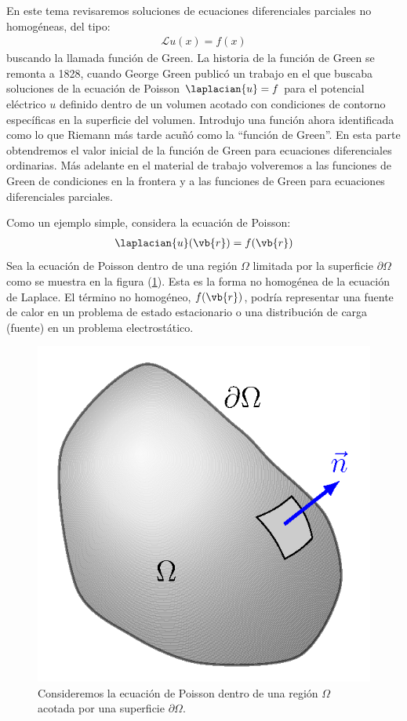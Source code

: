 En este tema revisaremos soluciones de ecuaciones diferenciales parciales no homogéneas, del tipo:
\begin{align*}
\mathcal{L} u (x) = f (x)
\end{align*}
buscando la llamada función de Green. La historia de la función de Green se remonta a 1828, cuando George Green publicó un trabajo en el que buscaba soluciones de la ecuación de Poisson $\laplacian{u} = f$ para el potencial eléctrico $u$ definido dentro de un volumen acotado con condiciones de contorno específicas en la superficie del volumen. Introdujo una función ahora identificada como lo que Riemann más tarde acuñó como la \enquote{función de Green}. En esta parte obtendremos el valor inicial de la función de Green para ecuaciones diferenciales ordinarias. Más adelante en el material de trabajo volveremos a las funciones de Green de condiciones en la frontera y a las funciones de Green para ecuaciones diferenciales parciales.
\par
Como un ejemplo simple, considera la ecuación de Poisson:
\begin{align*}
\laplacian{u} (\vb{r}) = f (\vb{r})
\end{align*}
Sea la ecuación de Poisson dentro de una región $\Omega$ limitada por la superficie $\partial \Omega$ como se muestra en la figura (\ref{fig:figura_07_01}). Esta es la forma no homogénea de la ecuación de Laplace. El término no homogéneo, $f (\vb{r})$, podría representar una fuente de calor en un problema de estado estacionario o una distribución de carga (fuente) en un problema electrostático.
\begin{figure}[H]
    \centering
    \includegraphics[scale=0.35]{Imagenes/Funcion_Green_01.png}
    \caption{Consideremos la ecuación de Poisson dentro de una región $\Omega$ acotada por una superficie $\partial \Omega$.}
    \label{fig:figura_07_01}
\end{figure}
